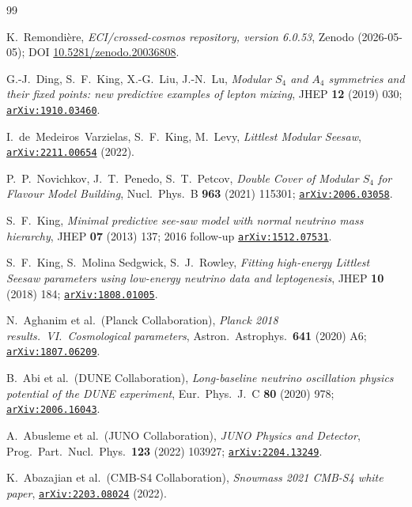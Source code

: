 \documentclass[aps,prl,twocolumn,showpacs,superscriptaddress]{revtex4-2}
\newcommand{\arXiv}[1]{\href{https://arxiv.org/abs/#1}{\texttt{arXiv:#1}}}
\begin{document}
\begin{thebibliography}{99}

K.~Remondi\`ere,
\emph{ECI/crossed-cosmos repository, version 6.0.53},
Zenodo (2026-05-05);
DOI \href{https://doi.org/10.5281/zenodo.20036808}{10.5281/zenodo.20036808}.

G.-J.~Ding, S.~F.~King, X.-G.~Liu, J.-N.~Lu,
\emph{Modular $S_4$ and $A_4$ symmetries and their fixed points:
new predictive examples of lepton mixing},
JHEP \textbf{12} (2019) 030;
\arXiv{1910.03460}.

I.~de~Medeiros~Varzielas, S.~F.~King, M.~Levy,
\emph{Littlest Modular Seesaw},
\arXiv{2211.00654} (2022).

P.~P.~Novichkov, J.~T.~Penedo, S.~T.~Petcov,
\emph{Double Cover of Modular $S_4$ for Flavour Model Building},
Nucl.~Phys.~B \textbf{963} (2021) 115301;
\arXiv{2006.03058}.

S.~F.~King,
\emph{Minimal predictive see-saw model with normal neutrino mass
hierarchy},
JHEP \textbf{07} (2013) 137; 2016 follow-up
\arXiv{1512.07531}.

S.~F.~King, S.~Molina Sedgwick, S.~J.~Rowley,
\emph{Fitting high-energy Littlest Seesaw parameters using low-energy
neutrino data and leptogenesis},
JHEP \textbf{10} (2018) 184;
\arXiv{1808.01005}.

N.~Aghanim et al.\ (Planck Collaboration),
\emph{Planck 2018 results.\ VI.\ Cosmological parameters},
Astron.~Astrophys.\ \textbf{641} (2020) A6;
\arXiv{1807.06209}.

B.~Abi et al.\ (DUNE Collaboration),
\emph{Long-baseline neutrino oscillation physics potential of the
DUNE experiment},
Eur.~Phys.~J.~C \textbf{80} (2020) 978;
\arXiv{2006.16043}.

A.~Abusleme et al.\ (JUNO Collaboration),
\emph{JUNO Physics and Detector},
Prog.\ Part.\ Nucl.\ Phys.\ \textbf{123} (2022) 103927;
\arXiv{2204.13249}.

K.~Abazajian et al.\ (CMB-S4 Collaboration),
\emph{Snowmass 2021 CMB-S4 white paper},
\arXiv{2203.08024} (2022).

\end{thebibliography}
\end{document}
